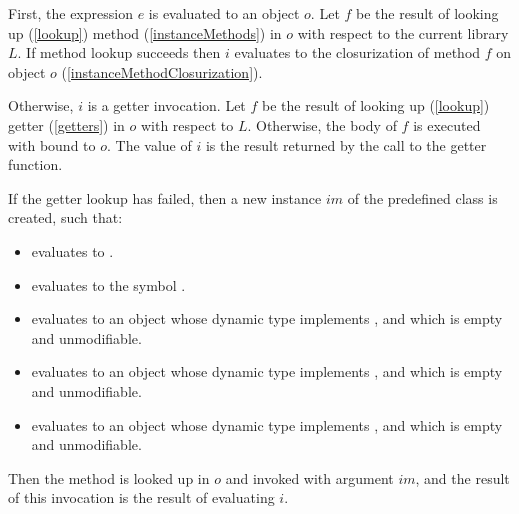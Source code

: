 \documentclass[makeidx]{article}
\begin{document}
{\LMHash{}%
First, the expression $e$ is evaluated to an object $o$.
Let $f$ be the result of looking up (\ref{lookup}) method
(\ref{instanceMethods})
\id{} in $o$ with respect to the current library $L$.
If method lookup succeeds then $i$ evaluates to
the closurization of method $f$ on object $o$
(\ref{instanceMethodClosurization}).


\LMHash{}%
Otherwise, $i$ is a getter invocation.
Let $f$ be the result of looking up (\ref{lookup}) getter
(\ref{getters})
\id{} in $o$ with respect to $L$.
Otherwise, the body of $f$ is executed with \THIS{} bound to $o$.
The value of $i$ is the result returned by the call to the getter function.

\LMHash{}%
If the getter lookup has failed,
then a new instance $im$ of the predefined class  is created,
such that:
\begin{itemize}
\item {} evaluates to \TRUE.
\item {} evaluates to the symbol .
\item {} evaluates to an object
  whose dynamic type implements ,
  and which is empty and unmodifiable.
\item {} evaluates to an object
  whose dynamic type implements ,
  and which is empty and unmodifiable.
\item {} evaluates to an object
  whose dynamic type implements ,
  and which is empty and unmodifiable.
\end{itemize}

\LMHash{}%
Then the method  is looked up
in $o$ and invoked with argument $im$,
and the result of this invocation is the result of evaluating $i$.



}
\end{document}
